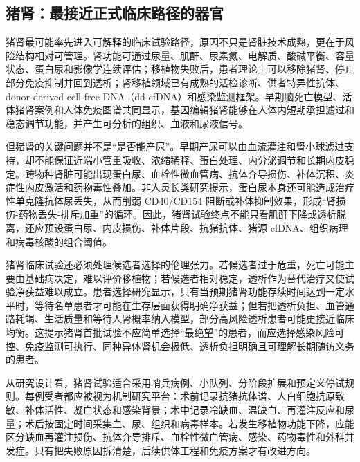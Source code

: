 \documentclass[
  chinese,
  11pt,a4paper]{article}
\begin{document}
\subsection{猪肾：最接近正式临床路径的器官}\label{ux732aux80beux6700ux63a5ux8fd1ux6b63ux5f0fux4e34ux5e8aux8defux5f84ux7684ux5668ux5b98}

猪肾最可能率先进入可解释的临床试验路径，原因不只是肾脏技术成熟，更在于风险结构相对可管理。肾功能可通过尿量、肌酐、尿素氮、电解质、酸碱平衡、容量状态、蛋白尿和影像学连续评估；移植物失败后，患者理论上可以移除猪肾、停止部分免疫抑制并回到透析；肾移植领域已有成熟的活检诊断、供者特异性抗体、donor-derived
cell-free
DNA（dd-cfDNA）和感染监测框架。早期脑死亡模型、活体猪肾案例和人体免疫图谱共同显示，基因编辑猪肾能够在人体内短期承担滤过和稳态调节功能，并产生可分析的组织、血液和尿液信号\citep{resultsoftwo2022, kawai2025porcinekidneynejm, physiologichomeostasisin2025, immuneprofilingin2026}。

但猪肾的关键问题并不是``是否能产尿''。早期产尿可以由血流灌注和肾小球滤过支持，却不能保证近端小管重吸收、浓缩稀释、蛋白处理、内分泌调节和长期内皮稳定。跨物种肾脏可能出现蛋白尿、血栓性微血管病、抗体介导损伤、补体沉积、炎症性内皮激活和药物毒性叠加。非人灵长类研究提示，蛋白尿本身还可能造成治疗性单克隆抗体尿丢失，从而削弱
CD40/CD154
阻断或补体抑制效果，形成``肾损伤-药物丢失-排斥加重''的循环\citep{novelfactorspotentially2024}。因此，猪肾试验终点不能只看肌酐下降或透析脱离，还应预设蛋白尿、内皮损伤、补体片段、抗猪抗体、猪源
cfDNA、组织病理和病毒核酸的组合阈值。

猪肾临床试验还必须处理候选者选择的伦理张力。若候选者过于危重，死亡可能主要由基础病决定，难以评价移植物；若候选者相对稳定，透析作为替代治疗又使试验净获益难以成立。患者选择研究显示，只有当预期猪肾功能存续时间达到一定水平时，等待名单患者才可能在生存层面获得明确净获益；但若把透析负担、血管通路耗竭、生活质量和等待人肾概率纳入模型，部分高风险透析患者可能更接近临床均衡\citep{adatadriven2025}。这提示猪肾首批试验不应简单选择``最绝望''的患者，而应选择感染风险可控、免疫监测可执行、同种异体肾机会极低、透析负担明确且可理解长期随访义务的患者\citep{suggestedpatientselection2021, internationalxenotransplantationassociat}。

从研究设计看，猪肾试验适合采用哨兵病例、小队列、分阶段扩展和预定义停试规则。每例受者都应被视为机制研究平台：术前记录抗猪抗体谱、人白细胞抗原致敏、补体活性、凝血状态和感染背景；术中记录冷缺血、温缺血、再灌注反应和尿量；术后按固定时间采集血、尿、组织和病毒样本。若发生移植物功能下降，应能区分缺血再灌注损伤、抗体介导排斥、血栓性微血管病、感染、药物毒性和外科并发症。只有把失败原因拆清楚，后续供体工程和免疫方案才有改进方向。
\end{document}
